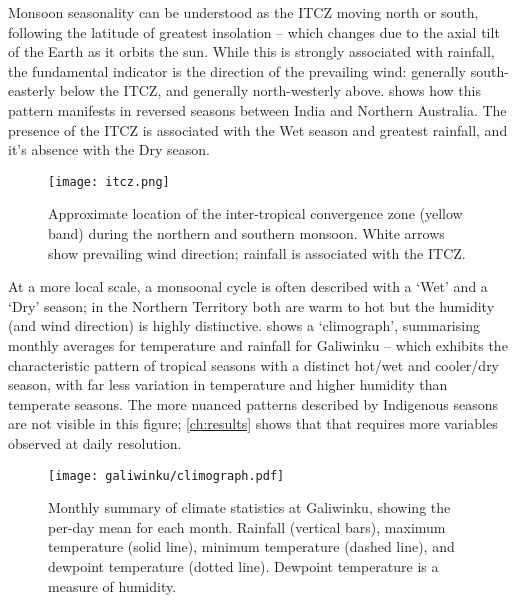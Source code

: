 Monsoon seasonality can be understood as the ITCZ moving north or south,
following the latitude of greatest insolation -- which changes due to the
axial tilt of the Earth as it orbits the sun.  While this is strongly
associated with rainfall, the fundamental indicator is the direction of
the prevailing wind: generally south-easterly below the ITCZ, and generally
north-westerly above.   shows how this pattern
manifests in reversed seasons between India and Northern Australia.
The presence of the ITCZ is associated with the Wet season and greatest
rainfall, and it's absence with the Dry season.

\begin{figure}[h]
    \centering
    \texttt{[image: itcz.png]}
    \caption[ITCZ showing northern and southern monsoon]{
        Approximate location of the inter-tropical convergence zone
        (yellow band) during the northern and southern monsoon.
        White arrows show prevailing wind direction; rainfall is
        associated with the ITCZ.  \citep[image:][]{boos2014}}
    \label{fig:itcz-india-aus}
\end{figure}

At a more local scale, a monsoonal cycle is often described with a `Wet'
and a `Dry' season; in the Northern Territory both are warm to hot but
the humidity (and wind direction) is highly distinctive.
%
 shows a `climograph', summarising monthly
averages for temperature and rainfall for Galiwinku -- which exhibits the
characteristic pattern of tropical seasons with a distinct hot/wet and
cooler/dry season, with far less variation in temperature and higher
humidity than temperate seasons.
%
The more nuanced patterns described by Indigenous seasons are not visible
in this figure; \cref{ch:results} shows that that requires more variables
observed at daily resolution.

\begin{figure}[h]
    \centering
    \texttt{[image: galiwinku/climograph.pdf]}
    \caption[Monthly Climograph for Galiwinku]{
        Monthly summary of climate statistics at Galiwinku, showing the per-day
        mean for each month.  Rainfall (vertical bars), maximum temperature
        (solid line), minimum temperature (dashed line), and  dewpoint
        temperature (dotted line).  Dewpoint temperature is a measure of humidity.}
    \label{fig:galiwinku-climograph}
\end{figure}


